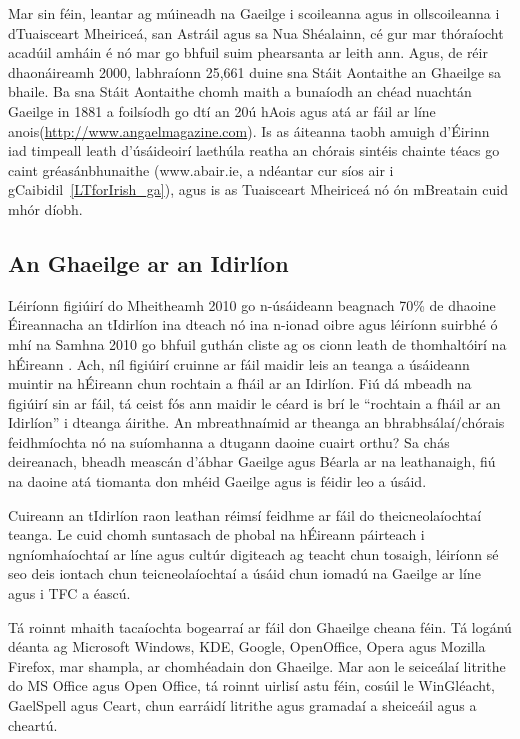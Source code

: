 \begin{multicols}{2}
Mar sin féin, leantar ag múineadh na Gaeilge i scoileanna agus in ollscoileanna i dTuaisceart Mheiriceá, san Astráil agus sa Nua Shéalainn, cé gur mar thóraíocht acadúil amháin é nó mar go bhfuil suim phearsanta ar leith ann. Agus, de réir dhaonáireamh 2000, labhraíonn 25,661 duine sna Stáit Aontaithe an Ghaeilge sa bhaile. Ba sna Stáit Aontaithe chomh maith a bunaíodh an chéad nuachtán Gaeilge in 1881 a foilsíodh go dtí an 20ú hAois agus atá ar fáil ar líne anois(\url{http://www.angaelmagazine.com}).  Is as áiteanna taobh amuigh d’Éirinn iad timpeall leath d’úsáideoirí laethúla reatha an chórais sintéis chainte téacs go caint gréasánbhunaithe (www.abair.ie, a ndéantar cur síos air i gCaibidil~\ref{LTforIrish_ga}), agus is as Tuaisceart Mheiriceá nó ón mBreatain cuid mhór díobh.


\subsection{An Ghaeilge ar an Idirlíon}

Léiríonn figiúirí do Mheitheamh 2010 go n-úsáideann beagnach 70\% de dhaoine Éireannacha an tIdirlíon ina dteach nó ina n-ionad oibre \cite{internetstats}agus léiríonn suirbhé ó mhí na Samhna 2010 go bhfuil guthán cliste ag os cionn leath de thomhaltóirí na hÉireann \cite{mindshare}. Ach, níl figiúirí cruinne ar fáil maidir leis an teanga a úsáideann muintir na hÉireann chun rochtain a fháil ar an Idirlíon. Fiú dá mbeadh na figiúirí sin ar fáil, tá ceist fós ann maidir le céard is brí le “rochtain a fháil ar an Idirlíon” i dteanga áirithe. An mbreathnaímid ar theanga an bhrabhsálaí/chórais feidhmíochta nó na suíomhanna a dtugann daoine cuairt orthu? Sa chás deireanach, bheadh meascán d’ábhar Gaeilge agus Béarla ar na leathanaigh, fiú na daoine atá tiomanta don mhéid Gaeilge agus is féidir leo a úsáid.

Cuireann an tIdirlíon raon leathan réimsí feidhme ar fáil do theicneolaíochtaí teanga. Le cuid chomh suntasach de phobal na hÉireann páirteach i ngníomhaíochtaí ar líne agus cultúr digiteach ag teacht chun tosaigh, léiríonn sé seo deis iontach chun teicneolaíochtaí a úsáid chun iomadú na Gaeilge ar líne agus i TFC a éascú.

Tá roinnt mhaith tacaíochta bogearraí ar fáil don Ghaeilge cheana féin.  Tá logánú déanta ag Microsoft Windows, KDE, Google, OpenOffice, Opera agus Mozilla Firefox, mar shampla, ar chomhéadain don Ghaeilge. Mar aon le seiceálaí litrithe do MS Office agus Open Office, tá roinnt uirlisí astu féin, cosúil le WinGléacht, GaelSpell agus Ceart, chun earráidí litrithe agus gramadaí a sheiceáil agus a cheartú. 


\end{multicols}
